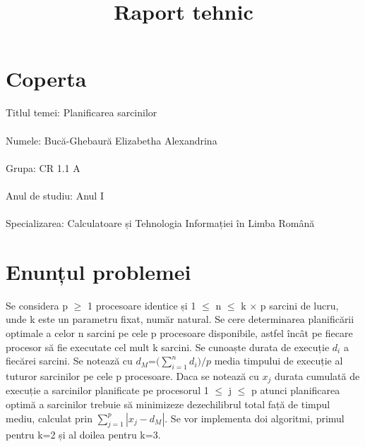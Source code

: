\documentclass{article}
\title{Raport tehnic}
\begin{document}
\maketitle

\section{Coperta}
\large{
Titlul temei: Planificarea sarcinilor \\
\\
Numele: Bucă-Ghebaură Elizabetha Alexandrina \\
\\
Grupa: CR 1.1 A \\
\\
Anul de studiu: Anul I \\
\\
Specializarea: Calculatoare și Tehnologia Informației în Limba Română 
}



\newpage
\section{Enunțul problemei}
\vspace{1cm}
Se considera p $\geq$ 1 procesoare identice și 1 $\leq$ n $\leq$ k $\times$ p sarcini de lucru, unde k este un parametru fixat, număr natural. Se cere determinarea planificării optimale a celor n sarcini pe cele p procesoare disponibile, astfel încât pe fiecare procesor să fie executate cel mult k sarcini. Se cunoaște durata de execuție $d_{i}$ a fiecărei sarcini. Se notează cu $d_{M}$=$($$\sum_{i=1}^{n}d_{i}$$)/p$ media timpului de execuție al tuturor sarcinilor pe cele p procesoare. Daca se notează cu $x_{j}$ durata cumulată de execuție a sarcinilor planificate pe procesorul 1 $\leq$ j $\leq$ p atunci planificarea optimă a sarcinilor trebuie să minimizeze dezechilibrul total față de timpul mediu, calculat prin $\sum_{j=1}^{p}|x_{j}-d_{M}|$. Se vor implementa doi algoritmi, primul pentru k=2 și al doilea pentru k=3.

\newpage 
\end{document}
